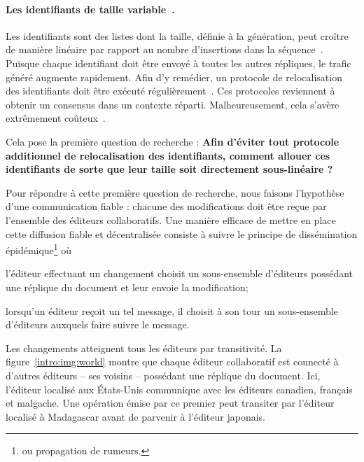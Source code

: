 \paragraph{Les identifiants de taille variable~\cite{weiss2009logoot}.} Les
identifiants sont des listes dont la taille, définie à la génération, peut
croître de manière linéaire par rapport au nombre d'insertions dans la
séquence~\cite{weiss2009logoot}. %
Puisque chaque identifiant doit être envoyé à toutes les autres répliques, le
trafic généré augmente rapidement.  Afin d'y remédier, un protocole de
relocalisation des identifiants doit être exécuté
régulièrement~\cite{zawirskiasynchronous}. Ces protocoles reviennent à obtenir
un consensus dans un contexte réparti. Malheureusement, cela s'avère extrêmement
coûteux~\cite{mostefaoui2015signature}.

Cela pose la première question de recherche : \textbf{Afin d'éviter tout
  protocole additionnel de relocalisation des identifiants, comment allouer ces
  identifiants de sorte que leur taille soit directement sous-linéaire ?}

Pour répondre à cette première question de recherche, nous faisons l'hypothèse
d'une communication fiable : chacune des modifications doit être reçue par
l'ensemble des éditeurs collaboratifs.
Une manière efficace de mettre en place cette diffusion fiable et décentralisée
consiste à suivre le principe de dissémination épidémique\footnote{ou propagation
  de rumeurs.}  où
\begin{inparaenum}[(i)]
\item l'éditeur effectuant un changement choisit un sous-ensemble d'éditeurs
  possédant une réplique du document et leur envoie la modification;
\item lorsqu'un éditeur reçoit un tel message, il choisit à son tour un
  sous-ensemble d'éditeurs auxquels faire suivre le message.
\end{inparaenum}
Les changements atteignent tous les éditeurs par transitivité.
La figure~\ref{intro:img:world} montre que chaque éditeur collaboratif est
connecté à d'autres éditeurs -- ses voisins -- possédant une réplique du
document. Ici, l'éditeur localisé aux États-Unis communique avec les éditeurs
canadien, français et malgache.
Une opération émise par ce premier peut transiter par l'éditeur localisé à
Madagascar avant de parvenir à l'éditeur japonais. 

